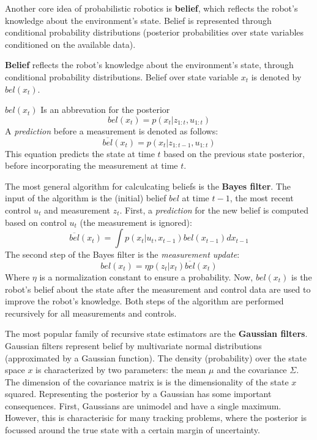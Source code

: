 Another core idea of probabilistic robotics is \textbf{belief}, which reflects the robot's knowledge about the environment's state.
Belief is represented through conditional probability distributions (posterior probabilities over state variables conditioned on the available data).
\begin{mydef}
\textbf{Belief} reflects the robot's knowledge about the environment's state, through conditional probability distributions.
Belief over state variable $x_t$ is denoted by $bel(x_t)$.
\end{mydef}
$bel(x_t)$ Is an abbrevation for the posterior
\begin{equation}
bel(x_t) = p(x_t | z_{1:t}, u_{1:t})
\end{equation}
A \textit{prediction} before a measurement is denoted as follows:
\begin{equation}
\overline{bel}(x_t) = p(x_t | z_{1:t-1}, u_{1:t})
\end{equation}
This equation predicts the state at time $t$ based on the previous state posterior, before incorporating the measurement at time $t$.

The most general algorithm for calculcating beliefs is the \textbf{Bayes filter}.
The input of the algorithm is the (initial) belief $bel$ at time $t-1$, the most recent control $u_t$ and measurement $z_t$.
First, a \textit{prediction} for the new belief is computed based on control $u_t$ (the measurement is ignored):
\begin{equation}
\overline{bel}(x_t) = \int p(x_t | u_t, x_{t-1}) bel(x_{t-1}) dx_{t-1}
\end{equation}
The second step of the Bayes filter is the \textit{measurement update}:
\begin{equation}
bel(x_t) = \eta p(z_t | x_t) \overline{bel}(x_t)
\end{equation}
Where $\eta$ is a normalization constant to ensure a probability.
Now, $bel(x_t)$ is the robot's belief about the state after the measurement and control data are used to improve the robot's knowledge.
Both steps of the algorithm are performed recursively for all measurements and controls.

The most popular family of recursive state estimators are the \textbf{Gaussian filters}.
Gaussian filters represent belief by multivariate normal distributions (approximated by a Gaussian function).
The density (probability) over the state space $x$ is characterized by two parameters: the mean $\mu$ and the covariance $\Sigma$.
The dimension of the covariance matrix is is the dimensionality of the state $x$ squared.
Representing the posterior by a Gaussian has some important consequences.
First, Gaussians are unimodel and have a single maximum.
However, this is characterisic for many tracking problems, where the posterior is focussed around the true state with a certain margin of uncertainty.

